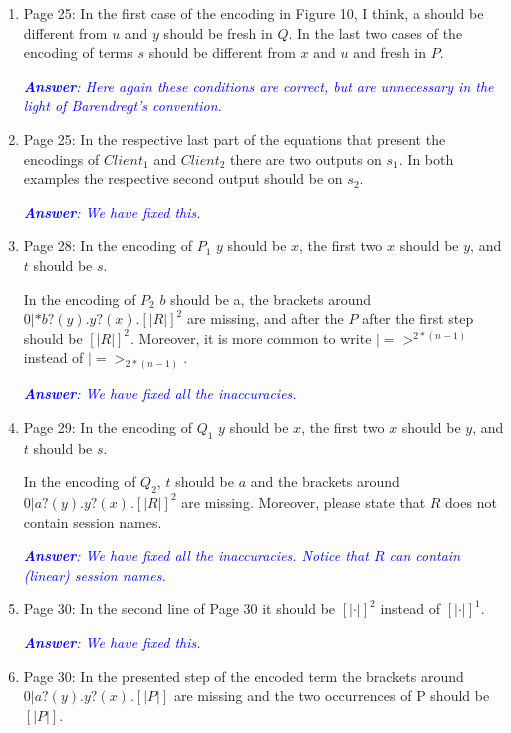\documentclass[11pt,a4paper]{article}
\newcommand{\answ}[1]{\smallskip \emph{\textcolor{blue}{\textbf{Answer}:  #1}}}
\newcommand{\checkthis}{}
\begin{document}
\begin{enumerate}
  \answ{Thanks for the remark and suggestion. We have revised the formulation of 1(d)--1(f) by fixing $P$ up to structural congruence. \checkthis}
  
\item Page 25: In the first case of the encoding in Figure 10, I think, a should be 
  different from $u$ and $y$ should be fresh in $Q$. In the last two cases of the
  encoding of terms $s$ should be different from $x$ and $u$ and fresh in $P$.
  
  \answ{Here again these conditions are correct, but are unnecessary in the light of Barendregt's convention.}
  
\item  Page 25: In the respective last part of the equations that present the
  encodings of $Client_1$ and $Client_2$ there are two outputs on $s_1$. In both
  examples the respective second output should be on $s_2$.
  
  \answ{We have fixed this.}
  
\item  Page 28: In the encoding of $P_1$ $y$ should be $x$, the first two $x$ should be $y$,
  and $t$ should be $s$. 
  
  In the encoding of $P_2$ $b$ should be a, the brackets around
  $0 | *b?(y).y?(x).[|R|]^2$ are missing, and after the $P$ after the first step
  should be $[|R|]^2$. Moreover, it is more common to write $|=>^{2*(n-1)}$ instead
  of $|=>_{2*(n-1)}$.
  
  \answ{We have fixed all the inaccuracies.}
  
\item  Page 29: In the encoding of $Q_1$ $y$ should be $x$, the first two $x$ should be $y$,
  and $t$ should be $s$. 
  
  In the encoding of $Q_2$, $t$ should be $a$ and the brackets
  around $0 | a?(y).y?(x).[|R|]^2$ are missing. Moreover, please state that $R$ does
  not contain session names.
  
    \answ{We have fixed all the inaccuracies. Notice that $R$ can contain (linear) session names. \checkthis}
  
\item Page 30: In the second line of Page 30 it should be $[|\cdot|]^2$ instead of
  $[|\cdot|]^1$.
  
  \answ{We have fixed this.}
  
\item Page 30: In the presented step of the encoded term the brackets around
  $0 | a?(y).y?(x).[|P|]$ are missing and the two occurrences of P should be
  $[|P|]$.
  

\end{enumerate}
\end{document}
